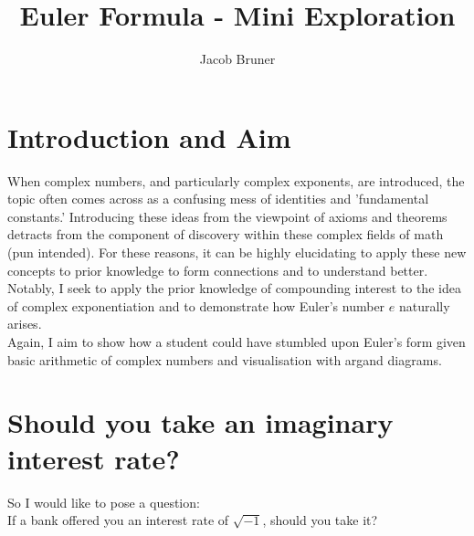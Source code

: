 \documentclass[11pt,a4paper]{article}
\author{Jacob Bruner}
\title{Euler Formula - Mini Exploration}
\begin{document}
\maketitle
\tableofcontents
\pagebreak

\section{Introduction and Aim}
When complex numbers, and particularly complex exponents, are introduced, the topic often comes across as a confusing mess of identities and 'fundamental constants.' Introducing these ideas from the viewpoint of axioms and theorems detracts from the component of discovery within these complex fields of math (pun intended). For these reasons, it can be highly elucidating to apply these new concepts to prior knowledge to form connections and to understand better. Notably, I seek to apply the prior knowledge of compounding interest to the idea of complex exponentiation and to demonstrate how Euler's number $e$ naturally arises.  \\

Again, I aim to show how a student could have stumbled upon Euler's form given basic arithmetic of complex numbers and visualisation with argand diagrams.

\pagebreak
\section{Should you take an imaginary interest rate?}

So I would like to pose a question:\\ If a bank offered you an interest rate of $\sqrt{-1}$, should you take it?\\ 
\end{document}

